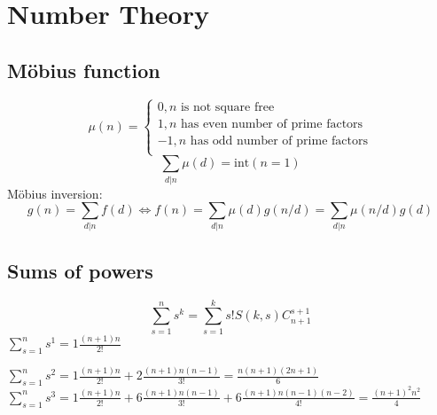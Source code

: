 \chapter{Number Theory}


\section{Möbius function}
$$\mu(n) = 
	\begin{cases}
		0, n \text{ is not square free}\\	
		1, n \text{ has even number of prime factors}\\
		-1, n \text{ has odd number of prime factors}\\
	\end{cases}
$$
$$\sum_{d | n} \mu(d) = \text{int}(n = 1)$$
Möbius inversion:
$$g(n) = \sum_{d | n} f(d) \iff f(n) = \sum_{d | n} \mu(d) g(n / d) = \sum_{d | n} \mu(n / d) g(d)$$

\section{Sums of powers}
$$\sum_{s = 1}^{n} s^k = \sum_{s = 1}^{k}s! S(k, s) C_{n + 1}^{s + 1}$$
$\sum_{s = 1}^{n} s^1 = 1\frac{(n + 1)n}{2!}$

$\sum_{s = 1}^{n} s^2 = 1\frac{(n + 1)n}{2!} + 2\frac{(n + 1)n(n-1)}{3!} = \frac{n(n+1)(2n+1)}{6}$
$\sum_{s = 1}^{n} s^3 = 1\frac{(n + 1)n}{2!} + 6\frac{(n + 1)n(n-1)}{3!} + 6\frac{(n + 1)n(n-1)(n-2)}{4!} = \frac{(n+1)^2n^2}{4}$